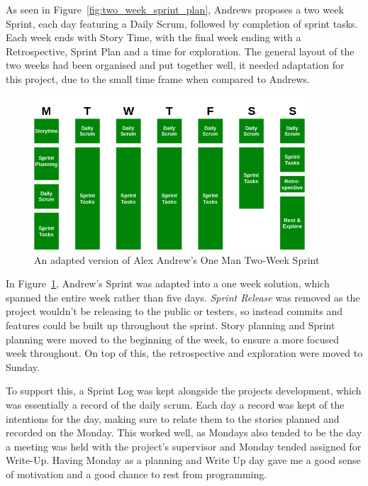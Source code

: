 \documentclass[a4paper,10pt]{report}
\begin{document}
As seen in Figure~\ref{fig:two_week_sprint_plan}, Andrews proposes a two week Sprint, each day featuring a Daily Scrum, followed by completion of sprint tasks. Each week ends with Story Time, with the final week ending with a Retrospective, Sprint Plan and a time for exploration. The general layout of the two weeks had been organised and put together well, it needed adaptation for this project, due to the small time frame when compared to Andrews. \medskip

\begin{figure}[h!]
    \centering
  \includegraphics[width=0.9\textwidth]{Images/Charts/Sprint_Plan.png}
 \caption{An adapted version of Alex Andrew's One Man Two-Week Sprint}
 \label{fig:one_week_sprint_plan}
\end{figure}

In Figure~\ref{fig:one_week_sprint_plan}, Andrew's Sprint was adapted into a one week solution, which spanned the entire week rather than five days. \textit{Sprint Release} was removed as the project wouldn't be releasing to the public or testers, so instead commits and features could be built up throughout the sprint. Story planning and Sprint planning were moved to the beginning of the week, to ensure a more focused week throughout. On top of this, the retrospective and exploration were moved to Sunday. \medskip

To support this, a Sprint Log was kept alongside the projects development, which was essentially a record of the daily scrum. Each day a record was kept of the intentions for the day, making sure to relate them to the stories planned and recorded on the Monday. This worked well, as Mondays also tended to be the day a meeting was held with the project's supervisor and Monday tended assigned for Write-Up. Having Monday as a planning and Write Up day gave me a good sense of motivation and a good chance to rest from programming. \medskip
\end{document}
